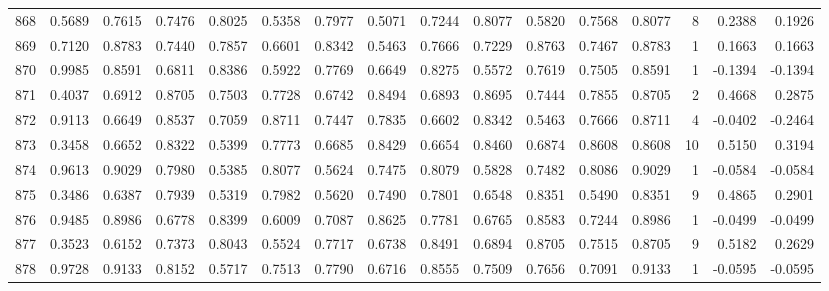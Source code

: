 \begin{tabular}{lrrrrrrrrrrrrrrr}
868 &      0.5689 &  0.7615 &  0.7476 &  0.8025 &  0.5358 &  0.7977 &  0.5071 &  0.7244 &  0.8077 &  0.5820 &   0.7568 &     0.8077 &      8 &                    0.2388 &                     0.1926 \\
869 &      0.7120 &  0.8783 &  0.7440 &  0.7857 &  0.6601 &  0.8342 &  0.5463 &  0.7666 &  0.7229 &  0.8763 &   0.7467 &     0.8783 &      1 &                    0.1663 &                     0.1663 \\
870 &      0.9985 &  0.8591 &  0.6811 &  0.8386 &  0.5922 &  0.7769 &  0.6649 &  0.8275 &  0.5572 &  0.7619 &   0.7505 &     0.8591 &      1 &                   -0.1394 &                    -0.1394 \\
871 &      0.4037 &  0.6912 &  0.8705 &  0.7503 &  0.7728 &  0.6742 &  0.8494 &  0.6893 &  0.8695 &  0.7444 &   0.7855 &     0.8705 &      2 &                    0.4668 &                     0.2875 \\
872 &      0.9113 &  0.6649 &  0.8537 &  0.7059 &  0.8711 &  0.7447 &  0.7835 &  0.6602 &  0.8342 &  0.5463 &   0.7666 &     0.8711 &      4 &                   -0.0402 &                    -0.2464 \\
873 &      0.3458 &  0.6652 &  0.8322 &  0.5399 &  0.7773 &  0.6685 &  0.8429 &  0.6654 &  0.8460 &  0.6874 &   0.8608 &     0.8608 &     10 &                    0.5150 &                     0.3194 \\
874 &      0.9613 &  0.9029 &  0.7980 &  0.5385 &  0.8077 &  0.5624 &  0.7475 &  0.8079 &  0.5828 &  0.7482 &   0.8086 &     0.9029 &      1 &                   -0.0584 &                    -0.0584 \\
875 &      0.3486 &  0.6387 &  0.7939 &  0.5319 &  0.7982 &  0.5620 &  0.7490 &  0.7801 &  0.6548 &  0.8351 &   0.5490 &     0.8351 &      9 &                    0.4865 &                     0.2901 \\
876 &      0.9485 &  0.8986 &  0.6778 &  0.8399 &  0.6009 &  0.7087 &  0.8625 &  0.7781 &  0.6765 &  0.8583 &   0.7244 &     0.8986 &      1 &                   -0.0499 &                    -0.0499 \\
877 &      0.3523 &  0.6152 &  0.7373 &  0.8043 &  0.5524 &  0.7717 &  0.6738 &  0.8491 &  0.6894 &  0.8705 &   0.7515 &     0.8705 &      9 &                    0.5182 &                     0.2629 \\
878 &      0.9728 &  0.9133 &  0.8152 &  0.5717 &  0.7513 &  0.7790 &  0.6716 &  0.8555 &  0.7509 &  0.7656 &   0.7091 &     0.9133 &      1 &                   -0.0595 &                    -0.0595 \\

\end{tabular}
